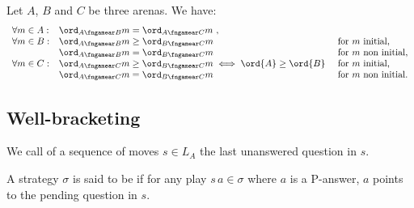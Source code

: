 \begin{lemma}
\label{lem:compositionorder} Let $A$, $B$ and $C$ be three arenas.
We have:
$$\begin{array}{lll}
\forall m \in A:
    &  \ord_{A\fngamear B}{m} = \ord_{A\fngamear C}{m} \ ,\\
\forall m \in B:
    & \ord_{A\fngamear B}{m} \geq \ord_{B\fngamear C}{m}  & \mbox{for $m$ initial,}\\
    & \ord_{A\fngamear B}{m} = \ord_{B\fngamear C}{m} & \mbox{for $m$ non initial,} \\
\forall m \in C:
    & \ord_{A\fngamear C}{m} \geq \ord_{B\fngamear C}{m} \iff
\ord{A} \geq \ord{B}\ & \mbox{for $m$ initial,}\\
    & \ord_{A\fngamear C}{m} = \ord_{B\fngamear C}{m}   & \mbox{for $m$ non initial.}
\end{array}
$$
\end{lemma}

\subsection{Well-bracketing}

We call  of a sequence of moves $s \in L_A$ the last unanswered question in $s$.

\begin{definition}\rm
A strategy $\sigma$ is said to be  if for any play $s \, a \in \sigma$ where $a$ is a  P-answer, $a$ points to the pending question in $s$.
\end{definition}



